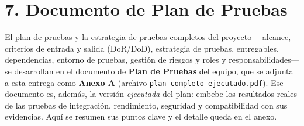 \documentclass[11pt,a4paper]{article}
\begin{document}
\section*{7. Documento de Plan de Pruebas}

El plan de pruebas y la estrategia de pruebas completos del proyecto —alcance, criterios
de entrada y salida (DoR/DoD), estrategia de pruebas, entregables, dependencias, entorno
de pruebas, gestión de riesgos y roles y responsabilidades— se desarrollan en el
documento de \textbf{Plan de Pruebas} del equipo, que se adjunta a esta entrega como
\textbf{Anexo A} (archivo \texttt{plan-completo-ejecutado.pdf}). Ese documento es, además,
la versión \emph{ejecutada} del plan: embebe los resultados reales de las pruebas de
integración, rendimiento, seguridad y compatibilidad con sus evidencias. Aquí se resumen
sus puntos clave y el detalle queda en el anexo.
\end{document}
